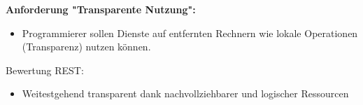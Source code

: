 \textbf{Anforderung "Transparente Nutzung":}
\begin{itemize}
	\item Programmierer sollen Dienste auf entfernten Rechnern wie lokale Operationen (Transparenz) nutzen können.
\end{itemize}
Bewertung REST:
\begin{itemize}
	\item Weitestgehend transparent dank nachvollziehbarer und logischer Ressourcen
\end{itemize}
